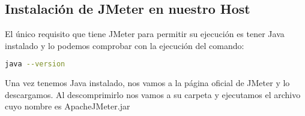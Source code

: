 \subsection{Instalación de JMeter en nuestro Host}

El único requisito que tiene JMeter para permitir su ejecución es tener Java instalado y lo podemos comprobar con la ejecución del comando:

\begin{lstlisting}[language=bash]
    java --version
\end{lstlisting}

Una vez tenemos Java instalado, nos vamos a la página oficial de JMeter y lo descargamos. Al descomprimirlo nos vamos a su carpeta y ejecutamos el archivo cuyo nombre es ApacheJMeter.jar

